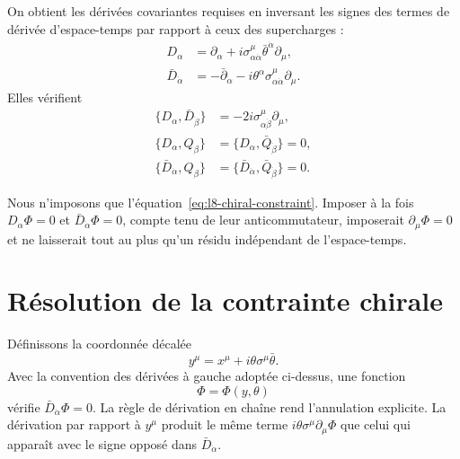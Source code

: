 On obtient les dérivées covariantes requises en inversant les signes des termes de dérivée d’espace-temps par rapport à ceux des supercharges :
\begin{align}
D_\alpha
&=\partial_\alpha
+i\sigma^\mu_{\alpha\dot\alpha}
\bar\theta^{\dot\alpha}\partial_\mu,
\label{eq:l8-D}\\
\bar D_{\dot\alpha}
&=-\bar\partial_{\dot\alpha}
-i\theta^\alpha\sigma^\mu_{\alpha\dot\alpha}\partial_\mu.
\label{eq:l8-Dbar}
\end{align}
Elles vérifient
\begin{align}
\{D_\alpha,\bar D_{\dot\beta}\}
&=-2i\sigma^\mu_{\alpha\dot\beta}\partial_\mu,\\
\{D_\alpha,Q_\beta\}
&=\{D_\alpha,\bar Q_{\dot\beta}\}=0,\\
\{\bar D_{\dot\alpha},Q_\beta\}
&=\{\bar D_{\dot\alpha},\bar Q_{\dot\beta}\}=0.
\end{align}

\begin{classroomqa}
\end{classroomqa}

Nous n’imposons que l’équation~\eqref{eq:l8-chiral-constraint}. Imposer à la fois \(D_\alpha\Phi=0\) et \(\bar D_{\dot\alpha}\Phi=0\), compte tenu de leur anticommutateur, imposerait \(\partial_\mu\Phi=0\) et ne laisserait tout au plus qu’un résidu indépendant de l’espace-temps.

\section{Résolution de la contrainte chirale}

Définissons la coordonnée décalée
\begin{equation}
y^\mu=x^\mu+i\theta\sigma^\mu\bar\theta.
\label{eq:l8-chiral-coordinate}
\end{equation}
Avec la convention des dérivées à gauche adoptée ci-dessus, une fonction
\begin{equation}
\Phi=\Phi(y,\theta)
\label{eq:l8-chiral-solution}
\end{equation}
vérifie \(\bar D_{\dot\alpha}\Phi=0\). La règle de dérivation en chaîne rend l’annulation explicite. La dérivation par rapport à \(y^\mu\) produit le même terme \(i\theta\sigma^\mu\partial_\mu\Phi\) que celui qui apparaît avec le signe opposé dans \(\bar D_{\dot\alpha}\).

